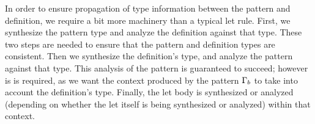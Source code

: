 \begin{mathpar}
   
\end{mathpar}
In order to ensure propagation of type information between the pattern and definition, we require a bit more machinery than a typical let rule. First, we synthesize the pattern type and analyze the definition against that type. These two steps are needed to ensure that the pattern and definition types are consistent. Then we synthesize the definition's type, and analyze the pattern against that type. This analysis of the pattern is guaranteed to succeed; however is is required, as we want the context produced by the pattern $\ctx_b$ to take into account the definition's type. Finally, the let body is synthesized or analyzed (depending on whether the let itself is being synthesized or analyzed) within that context.

